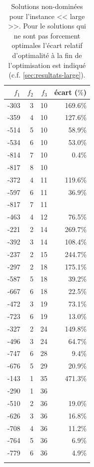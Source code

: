 \documentclass[12pt, a4paper, french, version=last, parskip=half, titlepage]{scrartcl}
\begin{document}
\begin{table}[H]
    \hspace*{1cm}
    \begin{tabular}{r r r r}
        \toprule
        $f_1$ & $f_2$ & $f_3$ & écart ($\%$) \\
        \midrule
        -303 &  3 & 10 & 169.6\% \\
        -359 &  4 & 10 & 127.6\% \\
        -514 &  5 & 10 &  58.9\% \\
        -534 &  6 & 10 &  53.0\% \\
        -814 &  7 & 10 &   0.4\% \\
        -817 &  8 & 10           \\
        -372 &  4 & 11 & 119.6\% \\
        -597 &  6 & 11 &  36.9\% \\
        -817 &  7 & 11           \\
        -463 &  4 & 12 &  76.5\% \\
        -221 &  2 & 14 & 269.7\% \\
        -392 &  3 & 14 & 108.4\% \\
        -237 &  2 & 15 & 244.7\% \\
        -297 &  2 & 18 & 175.1\% \\
        -587 &  5 & 18 &  39.2\% \\
        -667 &  6 & 18 &  22.5\% \\
        -472 &  3 & 19 &  73.1\% \\
        -723 &  6 & 19 &  13.0\% \\
        -327 &  2 & 24 & 149.8\% \\
        -496 &  3 & 24 &  64.7\% \\
        -747 &  6 & 28 &   9.4\% \\
        -676 &  5 & 29 &  20.9\% \\
        -143 &  1 & 35 & 471.3\% \\
        -290 &  1 & 36           \\
        -510 &  2 & 36 &  19.0\% \\
        -626 &  3 & 36 &  16.8\% \\
        -708 &  4 & 36 &  11.2\% \\
        -764 &  5 & 36 &   6.9\% \\
        -779 &  6 & 36 &   4.9\% \\
        \bottomrule\\
    \end{tabular}
    \caption{Solutions non-dominées pour l'instance << large >>. Pour le solutions qui ne sont pas forcement optimales l'écart relatif d'optimalité à la fin de l'optimisation est indiqué (c.f. \cref{sec:resultats-large}).}
\end{table}
\end{document}
